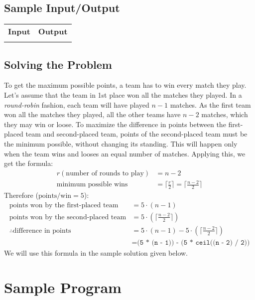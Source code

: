 \documentclass[12pt]{report}
\begin{document}
    \subsection*{Sample Input/Output}
    \begin{tabular}{ |l|l| } 
      \hline
      \textbf{Input} & \textbf{Output} \\
      {} & {} \\ %
      \hline
     \end{tabular}
    \subsection*{Solving the Problem}
    To get the maximum possible points, a team has to win every match they play. Let's assume that the team in 1st place won all the matches they played. In a \textit{round-robin} fashion, each team will have played $n-1$ matches. As the first team won all the matches they played, all the other teams have $n-2$ matches, which they may win or loose. To maximize the difference in points between the first-placed team and second-placed team, points of the second-placed team must be the minimum possible, without changing its standing. This will happen only when the team wins and looses an equal number of matches. Applying this, we get the formula:
    \begin{align*}
    r (\text{number of rounds to play}) &= n-2 \\
    \text{minimum possible wins} &= \lceil\frac{r}{2}\rceil = \lceil\frac{n-2}{2}\rceil
    \end{align*}
    Therefore ($\text{points/win}=5$):
    \begin{align*}
      \text{points won by the first-placed team} &= 5\cdot(n-1) \\
      \text{points won by the second-placed team} &= 5\cdot(\lceil\frac{n-2}{2}\rceil)\\
      \therefore\text{difference in points} &= 5\cdot(n-1) - 5\cdot(\lceil\frac{n-2}{2}\rceil)\\
      &= \texttt{(5 * (n - 1)) - (5 * ceil((n - 2) / 2))}
    \end{align*}
    We will use this formula in the sample solution given below.

	\section*{Sample Program}
	
	
\end{document}
